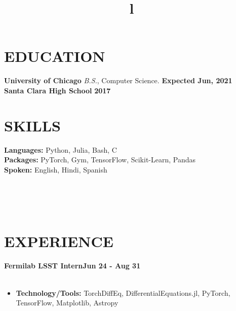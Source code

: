 \documentclass[margin]{res}
\begin{document}
\begin{resume}

\section{EDUCATION}
\textbf{University of Chicago}
{\sl B.S.}, Computer Science. \hfill \textbf{Expected Jun, 2021}\\
\textbf{Santa Clara High School} \hfill \textbf{2017}
\section{SKILLS}
\textbf{Languages:} Python, Julia, Bash, C\\
\textbf{Packages:}  PyTorch, Gym, TensorFlow, Scikit-Learn, Pandas \\
\textbf{Spoken:} English, Hindi, Spanish

\begin{format}
\title{l}\\
\\
\body\\
\end{format}
\section{EXPERIENCE}
\textbf{Fermilab LSST Intern\hfill Jun 24 - Aug 31}\\
\\
\begin{itemize}
    \item \textbf{Technology/Tools:} TorchDiffEq, DifferentialEquations.jl, PyTorch, TensorFlow, Matplotlib, Astropy
\end{itemize}

\end{resume}
\end{document}
